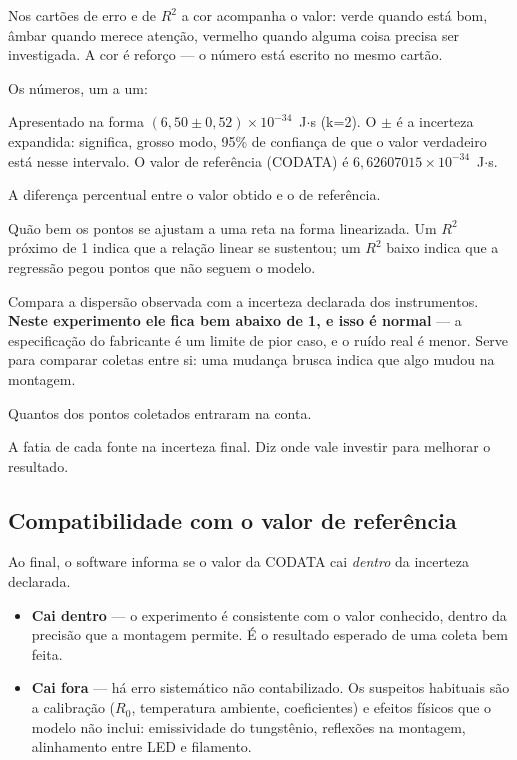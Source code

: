 \documentclass[11pt,a4paper]{article}
\begin{document}
Nos cartões de erro e de $R^2$ a cor acompanha o valor: verde quando está bom,
âmbar quando merece atenção, vermelho quando alguma coisa precisa ser
investigada. A cor é reforço --- o número está escrito no mesmo cartão.

Os números, um a um:

\begin{description}[style=nextline,leftmargin=0.6cm]
  \item[$h$ com sua incerteza]
    Apresentado na forma $(6{,}50 \pm 0{,}52)\times 10^{-34}$~J$\cdot$s (k=2).
    O $\pm$ é a incerteza expandida: significa, grosso modo, 95\% de confiança
    de que o valor verdadeiro está nesse intervalo. O valor de referência
    (CODATA) é $6{,}62607015 \times 10^{-34}$~J$\cdot$s.
  \item[Erro relativo]
    A diferença percentual entre o valor obtido e o de referência.
  \item[$R^2$]
    Quão bem os pontos se ajustam a uma reta na forma linearizada. Um $R^2$
    próximo de 1 indica que a relação linear se sustentou; um $R^2$ baixo
    indica que a regressão pegou pontos que não seguem o modelo.
  \item[$\chi^2$ reduzido]
    Compara a dispersão observada com a incerteza declarada dos instrumentos.
    \textbf{Neste experimento ele fica bem abaixo de 1, e isso é normal} --- a
    especificação do fabricante é um limite de pior caso, e o ruído real é
    menor. Serve para comparar coletas entre si: uma mudança brusca indica que
    algo mudou na montagem.
  \item[Pontos usados]
    Quantos dos pontos coletados entraram na conta.
  \item[Orçamento de incertezas]
    A fatia de cada fonte na incerteza final. Diz onde vale investir para
    melhorar o resultado.
\end{description}

\subsection{Compatibilidade com o valor de referência}

Ao final, o software informa se o valor da CODATA cai \emph{dentro} da
incerteza declarada.

\begin{itemize}[nosep]
  \item \textbf{Cai dentro} --- o experimento é consistente com o valor
        conhecido, dentro da precisão que a montagem permite. É o resultado
        esperado de uma coleta bem feita.
  \item \textbf{Cai fora} --- há erro sistemático não contabilizado. Os
        suspeitos habituais são a calibração ($R_0$, temperatura ambiente,
        coeficientes) e efeitos físicos que o modelo não inclui: emissividade
        do tungstênio, reflexões na montagem, alinhamento entre LED e
        filamento.
\end{itemize}
\end{document}
